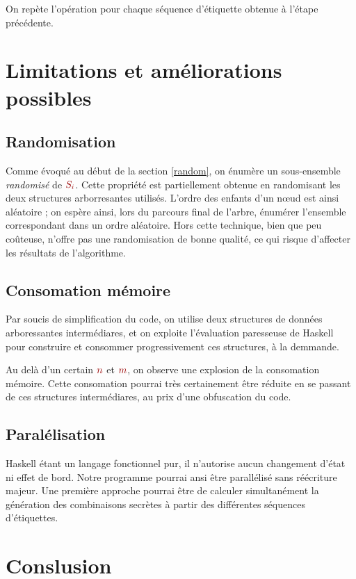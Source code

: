 \documentclass[a4paper]{article}
\renewcommand{\(}{\begin{math}\color{brick}}
\renewcommand{\)}{\end{math}}
\begin{document}
On repète l'opération pour chaque séquence d'étiquette obtenue à l'étape précédente.

\section{Limitations et améliorations possibles}

\subsection{Randomisation}
Comme évoqué au début de la section \ref{random}, on énumère un sous-ensemble {\em randomisé} de \(S_i\). Cette propriété est partiellement obtenue en randomisant les deux structures arborresantes utilisés. L'ordre des enfants d'un nœud est ainsi aléatoire ; on espère ainsi, lors du parcours final de l'arbre, énumérer l'ensemble correspondant dans un ordre aléatoire. Hors cette technique, bien que peu coûteuse, n'offre pas une randomisation de bonne qualité, ce qui risque d'affecter les résultats de l'algorithme.

\subsection{Consomation mémoire}
Par soucis de simplification du code, on utilise deux structures de données arboressantes intermédiares, et on exploite l'évaluation paresseuse de Haskell pour construire et consommer progressivement ces structures, à la demmande.

Au delà d'un certain \(n\) et \(m\), on observe une explosion de la consomation mémoire. Cette consomation pourrai très certainement être réduite en se passant de ces structures intermédiares, au prix d'une obfuscation du code.

\subsection{Paralélisation}
Haskell étant un langage fonctionnel pur, il n'autorise aucun changement d'état ni effet de bord. Notre programme pourrai ansi être parallélisé sans réécriture majeur. Une première approche pourrai être de calculer simultanément la génération des combinaisons secrètes à partir des différentes séquences d'étiquettes.

\section{Conslusion}
\end{document}
